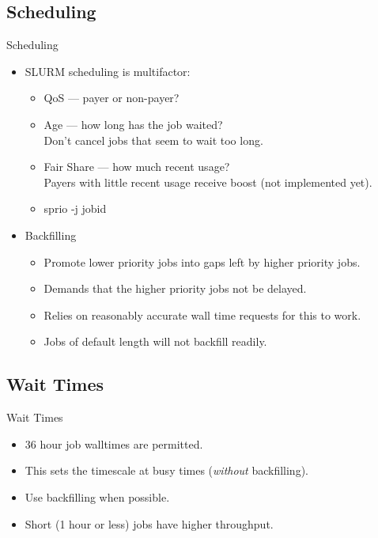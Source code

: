 \subsection{Scheduling}
\begin{frame}{Scheduling}
\begin{itemize}
\item{SLURM scheduling is multifactor:}
  \pause
\begin{itemize}
\item{\alert{QoS} --- payer or non-payer?}
  \pause
\item{\alert{Age} --- how long has the job waited?\hfill\\\qquad
  \alert{Don't cancel jobs that seem to wait too long.}}
  \pause
\item{\alert{Fair Share} --- how much recent usage?\hfill\\\qquad
  \alert{Payers with little recent usage receive boost (not implemented yet).}}
  \pause
\item{\alert{sprio -j jobid}}
\end{itemize}
\pause
\item{\alert{Backfilling}}
\begin{itemize}
  \item{Promote lower priority jobs into gaps left by higher priority jobs.}
    \item{Demands that the higher priority jobs not be delayed.}
    \item{Relies on reasonably accurate wall time requests for this to work.}
      \item{Jobs of default length will not backfill readily.}
\end{itemize}
\end{itemize}
\end{frame}

\subsection{Wait Times}
\begin{frame}{Wait Times}
  \begin{itemize}
  \item{36 hour job walltimes are permitted.}
    \pause
  \item{\alert{This sets the timescale at busy times (\emph{without} backfilling).}}
    \pause
  \item{Use backfilling when possible.}
  \item{Short (1 hour or less) jobs have higher throughput.}
\end{itemize}
\end{frame}

